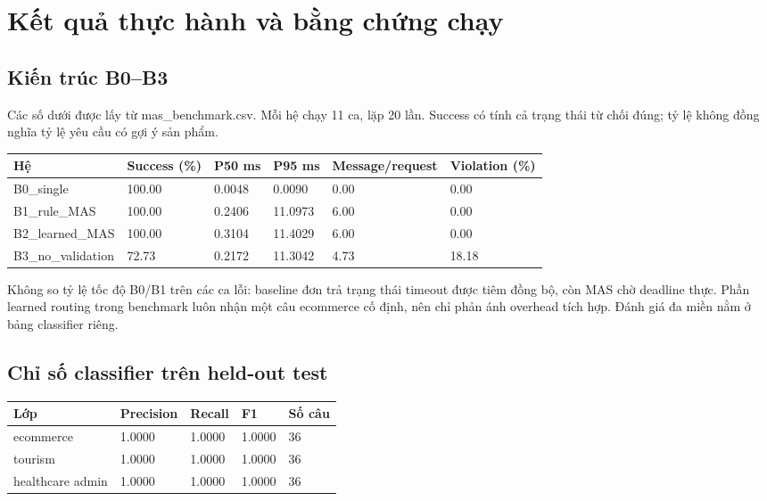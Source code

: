 \section{Kết quả thực hành và bằng chứng
chạy}\label{kux1ebft-quux1ea3-thux1ef1c-huxe0nh-vuxe0-bux1eb1ng-chux1ee9ng-chux1ea1y}

\subsection{Kiến trúc B0--B3}\label{kiux1ebfn-truxfac-b0b3}

Các số dưới được lấy từ mas\_benchmark.csv. Mỗi hệ chạy 11 ca, lặp 20
lần. Success có tính cả trạng thái từ chối đúng; tỷ lệ không đồng nghĩa
tỷ lệ yêu cầu có gợi ý sản phẩm.

{\def\LTcaptype{none} %
\begin{longtable}[]{@{}llllll@{}}
\toprule\noalign{}
Hệ & Success (\%) & P50 ms & P95 ms & Message/request & Violation
(\%) \\
\midrule\noalign{}
\endhead
\bottomrule\noalign{}
\endlastfoot
B0\_single & 100.00 & 0.0048 & 0.0090 & 0.00 & 0.00 \\
B1\_rule\_MAS & 100.00 & 0.2406 & 11.0973 & 6.00 & 0.00 \\
B2\_learned\_MAS & 100.00 & 0.3104 & 11.4029 & 6.00 & 0.00 \\
B3\_no\_validation & 72.73 & 0.2172 & 11.3042 & 4.73 & 18.18 \\
\end{longtable}
}

Không so tỷ lệ tốc độ B0/B1 trên các ca lỗi: baseline đơn trả trạng thái
timeout được tiêm đồng bộ, còn MAS chờ deadline thực. Phần learned
routing trong benchmark luôn nhận một câu ecommerce cố định, nên chỉ
phản ánh overhead tích hợp. Đánh giá đa miền nằm ở bảng classifier
riêng.

\subsection{Chỉ số classifier trên held-out
test}\label{chux1ec9-sux1ed1-classifier-truxean-held-out-test}

{\def\LTcaptype{none} %
\begin{longtable}[]{@{}lllll@{}}
\toprule\noalign{}
Lớp & Precision & Recall & F1 & Số câu \\
\midrule\noalign{}
\endhead
\bottomrule\noalign{}
\endlastfoot
ecommerce & 1.0000 & 1.0000 & 1.0000 & 36 \\
tourism & 1.0000 & 1.0000 & 1.0000 & 36 \\
healthcare admin & 1.0000 & 1.0000 & 1.0000 & 36 \\
\end{longtable}
}

